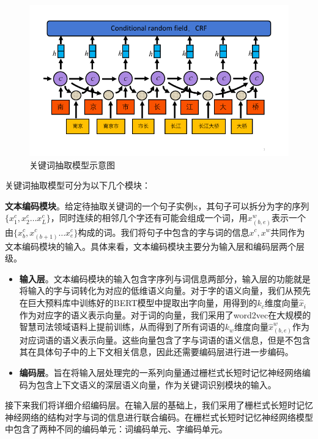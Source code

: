 \begin{figure}[ht]
    \centering
    \includegraphics[width=\linewidth]{figures/key_word}
    \caption{关键词抽取模型示意图}
    \label{fig:model2}
\end{figure}

关键词抽取模型可分为以下几个模块：

\textbf{文本编码模块}。给定待抽取关键词的一个句子实例x，其句子可以拆分为字的序列$\{x_{1}^{c},x_{2}^{c}… x_{L}^{c}\}$，同时连续的相邻几个字还有可能会组成一个词，用$x_{(b,e)}^{w}$表示一个由$\{x_{b}^{c},x_{(b+1)}^{c}… x_{e}^{c}\}$构成的词。我们将句子中包含的字与词的信息${x^{c},x^{w}}$共同作为文本编码模块的输入。具体来看，文本编码模块主要分为输入层和编码层两个层级。
\begin{itemize}
	\item \textbf{输入层}。文本编码模块的输入包含字序列与词信息两部分，输入层的功能就是将输入的字与词转化为对应的低维语义向量。对于字的语义向量，我们从预先在巨大预料库中训练好的BERT模型中提取出字向量，用得到的$k_{c}$维度向量$\hat{x}_{i}$作为对应字的语义表示向量。对于词的向量，我们采用了word2vec在大规模的智慧司法领域语料上提前训练，从而得到了所有词语的$k_{w}$维度向量$\hat{x}_{(b,e)}^{w}$作为对应词语的语义表示向量。这些向量包含了字与词语的语义信息，但是不包含其在具体句子中的上下文相关信息，因此还需要编码层进行进一步编码。
	\item \textbf{编码层}。旨在将输入层处理完的一系列向量通过栅栏式长短时记忆神经网络编码为包含上下文语义的深层语义向量，作为关键词识别模块的输入。
\end{itemize}

接下来我们将详细介绍编码层。在输入层的基础上，我们采用了栅栏式长短时记忆神经网络的结构对字与词的信息进行联合编码。在栅栏式长短时记忆神经网络模型中包含了两种不同的编码单元：词编码单元、字编码单元。

